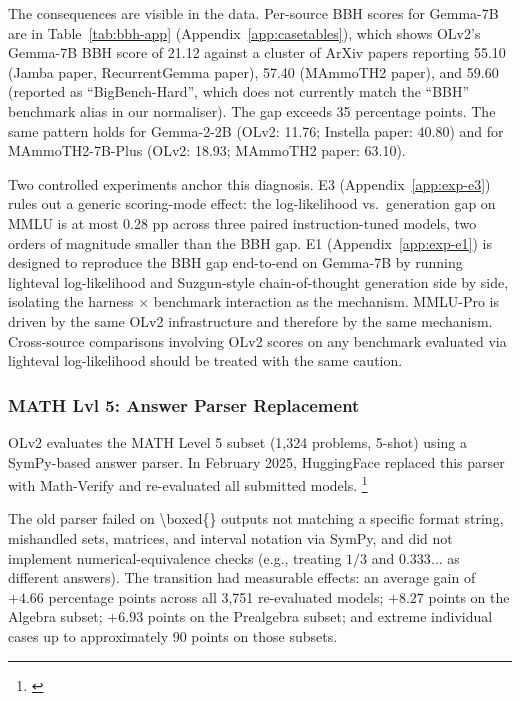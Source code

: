 \documentclass[11pt]{article}
\begin{document}
The consequences are visible in the data. Per-source BBH scores for Gemma-7B are in Table~\ref{tab:bbh-app} (Appendix~\ref{app:casetables}), which shows
OLv2's Gemma-7B BBH score of 21.12 against a cluster of ArXiv papers
reporting 55.10 (Jamba paper, RecurrentGemma paper), 57.40 (MAmmoTH2 paper),
and 59.60 (reported as ``BigBench-Hard'', which does not currently match the
``BBH'' benchmark alias in our normaliser). The gap exceeds 35 percentage
points. The same pattern holds for Gemma-2-2B (OLv2: 11.76; Instella paper:
40.80) and for MAmmoTH2-7B-Plus (OLv2: 18.93; MAmmoTH2 paper: 63.10).

Two controlled experiments anchor this diagnosis. E3
(Appendix~\ref{app:exp-e3}) rules out a generic scoring-mode effect: the
log-likelihood vs.\ generation gap on MMLU is at most 0.28 pp across three
paired instruction-tuned models, two orders of magnitude smaller than the
BBH gap. E1 (Appendix~\ref{app:exp-e1}) is designed to reproduce the BBH
gap end-to-end on Gemma-7B by running lighteval log-likelihood and
Suzgun-style chain-of-thought generation side by side, isolating the
harness $\times$ benchmark interaction as the mechanism. MMLU-Pro is
driven by the same OLv2 infrastructure and therefore by the same
mechanism. Cross-source comparisons involving OLv2 scores on any benchmark
evaluated via lighteval log-likelihood should be treated with the same
caution.

\subsubsection{MATH Lvl 5: Answer Parser Replacement}
\label{sec:math}

OLv2 evaluates the MATH Level 5 subset (1{,}324 problems, 5-shot) using
a SymPy-based answer parser. In February 2025, HuggingFace replaced this
parser with Math-Verify and re-evaluated all submitted models.%
\footnote{%
\cite{kydlicek2025mathverify}}

The old parser failed on \textbackslash{}boxed\{\} outputs not matching a
specific format string, mishandled sets, matrices, and interval notation via
SymPy, and did not implement numerical-equivalence checks (e.g., treating
$1/3$ and $0.333\ldots$ as different answers). The transition had measurable
effects: an average gain of $+4.66$ percentage points across all 3{,}751
re-evaluated models; $+8.27$ points on the Algebra subset; $+6.93$ points
on the Prealgebra subset; and extreme individual cases up to approximately
90 points on those subsets.
\end{document}
